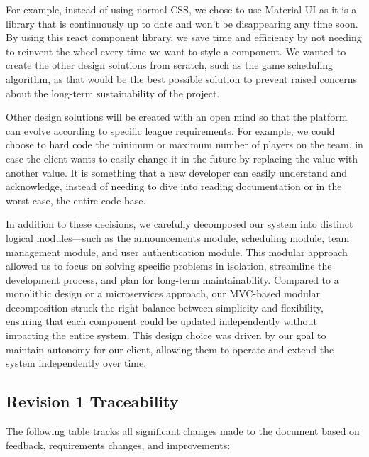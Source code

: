 \documentclass[12pt, titlepage]{article}
\begin{document}
\begin{enumerate}
        For example, instead of using normal CSS, we chose to use Material UI as it is a library that is continuously up to date and won’t be disappearing any time soon. By using this react component library, we save time and efficiency by not needing to reinvent the wheel every time we want to style a component. We wanted to create the other design solutions from scratch, such as the game scheduling algorithm, as that would be the best possible solution to prevent raised concerns about the long-term sustainability of the project.

        Other design solutions will be created with an open mind so that the platform can evolve according to specific league requirements. For example, we could choose to hard code the minimum or maximum number of players on the team, in case the client wants to easily change it in the future by replacing the value with another value. It is something that a new developer can easily understand and acknowledge, instead of needing to dive into reading documentation or in the worst case, the entire code base.

        In addition to these decisions, we carefully decomposed our system into distinct logical modules—such as the announcements module, scheduling module, team management module, and user authentication module. This modular approach allowed us to focus on solving specific problems in isolation, streamline the development process, and plan for long-term maintainability. Compared to a monolithic design or a microservices approach, our MVC-based modular decomposition struck the right balance between simplicity and flexibility, ensuring that each component could be updated independently without impacting the entire system. This design choice was driven by our goal to maintain autonomy for our client, allowing them to operate and extend the system independently over time.
\end{enumerate}

\subsection{Revision 1 Traceability}
The following table tracks all significant changes made to the document based on feedback, requirements changes, and improvements:

\newcommand{\issueLink}[1]{\href{https://github.com/dcheung11/team-6-capstone-project/issues/#1}{Issue #1}}
\end{document}
